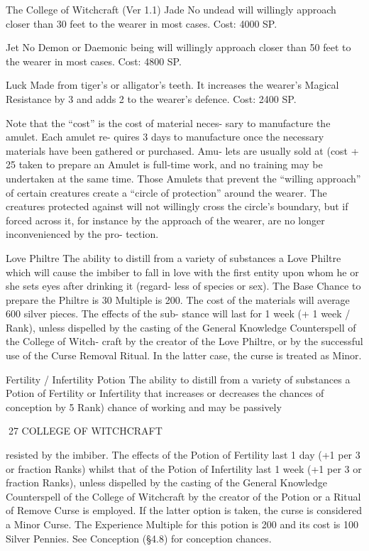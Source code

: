 \begin{Chapter}{The College of Witchcraft (Ver 1.1)}
Jade  No  undead  will  willingly  approach  closer 
than 30 feet to the wearer in most cases. Cost: 4000 
SP. 

Jet  No  Demon  or  Daemonic  being  will  willingly 
approach closer than 50 feet to the wearer in most 
cases. Cost: 4800 SP. 

Luck  Made  from  tiger’s  or  alligator’s  teeth.  It 
increases the wearer’s Magical Resistance by 3 and 
adds 2 to the wearer’s defence. Cost: 2400 SP. 

Note  that  the  “cost”  is  the  cost  of  material  neces-
sary  to  manufacture  the  amulet.  Each  amulet  re-
quires  3  days  to  manufacture  once  the  necessary 
materials  have  been  gathered  or  purchased.  Amu-
lets  are  usually  sold  at  (cost  +  25%
taken  to  prepare  an  Amulet  is  full-time  work,  and 
no  training  may  be  undertaken  at  the  same  time. 
Those Amulets that prevent the “willing approach” 
of  certain  creatures  create  a  “circle  of  protection” 
around the wearer. The creatures protected against 
will not willingly cross the circle’s boundary, but if 
forced across it, for instance by the approach of the 
wearer,  are  no  longer  inconvenienced  by  the  pro-
tection. 

Love Philtre The ability to distill from a variety of 
substances  a  Love  Philtre  which  will  cause  the 
imbiber  to  fall  in  love  with  the  first  entity  upon 
whom he or she sets eyes after drinking it (regard-
less of species or sex). The Base Chance to prepare 
the Philtre is 30%
Multiple  is  200.  The  cost  of  the  materials  will 
average  600  silver  pieces.  The  effects  of  the  sub-
stance  will  last  for  1  week  (+  1  week  /  Rank), 
unless  dispelled  by  the  casting  of  the  General 
Knowledge  Counterspell  of  the  College  of  Witch-
craft  by  the  creator  of  the  Love  Philtre,  or  by  the 
successful use of the Curse Removal Ritual. In the 
latter case, the curse is treated as Minor. 

Fertility  /  Infertility  Potion  The  ability  to  distill 
from a variety of substances a Potion of Fertility or 
Infertility that increases or decreases the chances of 
conception by 5%
Rank)  chance  of  working  and  may  be  passively 

27 COLLEGE OF WITCHCRAFT 

resisted by the imbiber. The effects of the Potion of 
Fertility  last  1  day  (+1  per  3  or  fraction  Ranks) 
whilst  that  of  the  Potion  of  Infertility  last  1  week 
(+1  per  3  or  fraction  Ranks),  unless  dispelled  by 
the casting of the General Knowledge Counterspell 
of  the  College  of  Witchcraft  by  the  creator  of  the 
Potion or a Ritual of Remove Curse is employed. If 
the latter option is taken, the curse is considered a 
Minor  Curse.  The  Experience  Multiple  for  this 
potion is 200 and its cost is 100 Silver Pennies. See 
Conception (§4.8) for conception chances. 


\end{Chapter}
